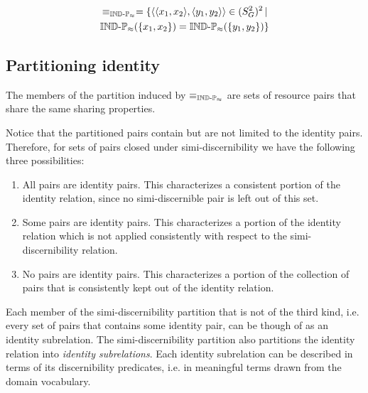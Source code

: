\begin{definition}
\label{def:simidiscernibility_relation}
\begin{align}
  \equiv_{\operatorname{{\mathbb{IND}-\mathbb{P}}}_{\approx}}
=
  \{
    \langle\langle x_1,x_2\rangle,\langle y_1,y_2\rangle\rangle \in (S_G^2)^2
  \,\vert\,\nonumber\\
    \operatorname{{\mathbb{IND}-\mathbb{P}}}_{\approx}(\{x_1,x_2\}) = \operatorname{{\mathbb{IND}-\mathbb{P}}}_{\approx}(\{y_1,y_2\})
  \}\nonumber
\end{align}
\end{definition}



\subsection{Partitioning identity}

The members of the partition induced by $\equiv_{\operatorname{{\mathbb{IND}-\mathbb{P}}}_{\approx}}$
  are sets of resource pairs that share the same sharing properties.

Notice that the partitioned pairs contain but are not limited to
  the identity pairs.
Therefore, for sets of pairs closed under simi-discernibility
  we have the following three possibilities:
  \begin{enumerate}
    \item All pairs are identity pairs.
          This characterizes a consistent portion of the identity relation,
          since no simi-discernible pair is left out of this set.
    \item Some pairs are identity pairs.
          This characterizes a portion of the identity relation which is not
          applied consistently with respect to
          the simi-discernibility relation.
    \item No pairs are identity pairs.
          This characterizes a portion of the collection of pairs
          that is consistently kept out of the identity relation.
  \end{enumerate}

\noindent Each member of the simi-discernibility partition that is not
  of the third kind, i.e. every set of pairs that contains some identity pair,
  can be though of as an identity subrelation.
The simi-discernibility partition also partitions the identity relation
  into \emph{identity subrelations}.
Each identity subrelation can be described in terms of
  its discernibility predicates,
  i.e. in meaningful terms drawn from the domain vocabulary.

